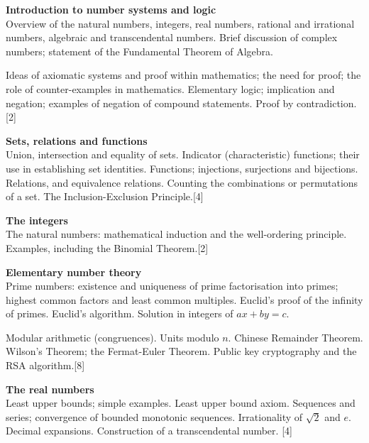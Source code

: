\documentclass[a4paper]{article}
\begin{document}
\maketitle
{
  \small
  \noindent\textbf{Introduction to number systems and logic}\\
  Overview of the natural numbers, integers, real numbers, rational and irrational numbers, algebraic and transcendental numbers. Brief discussion of complex numbers; statement of the Fundamental Theorem of Algebra.

  \vspace{5pt}
  \noindent Ideas of axiomatic systems and proof within mathematics; the need for proof; the role of counter-examples in mathematics. Elementary logic; implication and negation; examples of negation of compound statements. Proof by contradiction.\hspace*{\fill}[2]

  \vspace{10pt}
  \noindent\textbf{Sets, relations and functions}\\
  Union, intersection and equality of sets. Indicator (characteristic) functions; their use in establishing set identities. Functions; injections, surjections and bijections. Relations, and equivalence relations. Counting the combinations or permutations of a set. The Inclusion-Exclusion Principle.\hspace*{\fill}[4]

  \vspace{10pt}
  \noindent\textbf{The integers}\\
  The natural numbers: mathematical induction and the well-ordering principle. Examples, including the Binomial Theorem.\hspace*{\fill}[2]

  \vspace{10pt}
  \noindent\textbf{Elementary number theory}\\
  Prime numbers: existence and uniqueness of prime factorisation into primes; highest common factors and least common multiples. Euclid’s proof of the infinity of primes. Euclid’s algorithm. Solution in integers of $ax+by = c$.

  \vspace{5pt}
  \noindent Modular arithmetic (congruences). Units modulo $n$. Chinese Remainder Theorem. Wilson's Theorem; the Fermat-Euler Theorem. Public key cryptography and the RSA algorithm.\hspace*{\fill}[8]

  \vspace{10pt}
  \noindent\textbf{The real numbers}\\
  Least upper bounds; simple examples. Least upper bound axiom. Sequences and series; convergence of bounded monotonic sequences. Irrationality of $\sqrt{2}$ and $e$. Decimal expansions. Construction of a transcendental number.\hspace*{\fill} [4]

}
\end{document}

